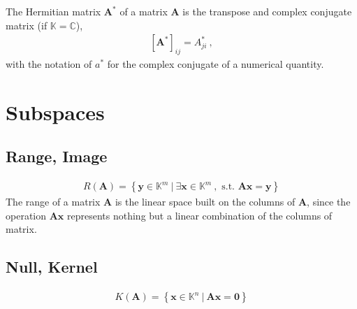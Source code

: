 \documentclass[letterpaper,10pt,english]{jupyterBook}
\begin{document}
\sphinxAtStartPar
{} The Hermitian matrix \(\mathbf{A}^*\) of a matrix \(\mathbf{A}\) is the transpose and complex conjugate matrix (if \(\mathbb{K} = \mathbb{C}\)),
\begin{equation*}
\begin{split}[\mathbf{A}^*]_{ij} = A^*_{ji} \ ,\end{split}
\end{equation*}
\sphinxAtStartPar
with the notation of \(a^*\) for the complex conjugate of a numerical quantity.


\section{Subspaces}
\label{\detokenize{ch/linear-algebra/matrices:subspaces}}\label{\detokenize{ch/linear-algebra/matrices:math-linear-algebra-matrix-subspaces}}

\subsection{Range, Image}
\label{\detokenize{ch/linear-algebra/matrices:range-image}}\label{\detokenize{ch/linear-algebra/matrices:math-linear-algebra-matrix-subspaces-range}}\begin{equation*}
\begin{split}R(\mathbf{A}) = \left\{ \mathbf{y} \in \mathbb{K}^m \ | \ \exists \mathbf{x} \in \mathbb{K}^m \ , \text{ s.t. } \mathbf{A} \mathbf{x} = \mathbf{y} \right\}\end{split}
\end{equation*}
\sphinxAtStartPar
The range of a matrix \(\mathbf{A}\) is the linear space built on the columns of \(\mathbf{A}\), since the operation \(\mathbf{A} \mathbf{x}\) represents nothing but a linear combination of the columns of matrix.


\subsection{Null, Kernel}
\label{\detokenize{ch/linear-algebra/matrices:null-kernel}}\label{\detokenize{ch/linear-algebra/matrices:math-linear-algebra-matrix-subspaces-null}}\begin{equation*}
\begin{split}K(\mathbf{A}) = \left\{ \mathbf{x} \in \mathbb{K}^n \ | \ \mathbf{A} \mathbf{x} = \mathbf{0} \right\}\end{split}
\end{equation*}
\end{document}
